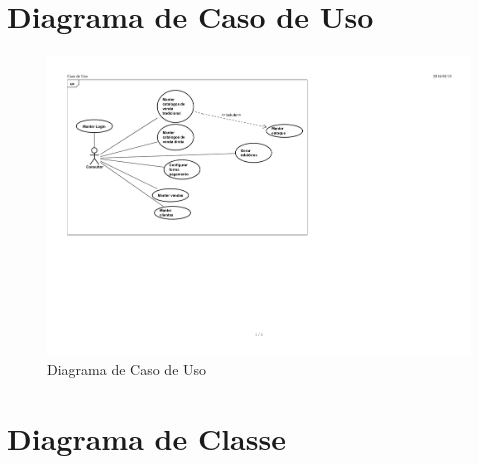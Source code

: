 \documentclass[chapter=TITLE,12pt,oneside,a4paper,english,french,sumario=tradicional,spanish,brazil,]{abntex2}
\begin{document}
\section{Diagrama de Caso de Uso}
\begin{figure}[!htpb]\centering
	\includegraphics[scale=1.02]{caso-de-uso.pdf}\caption{Diagrama de Caso de Uso\label{uc}}
\end{figure}


\section{Diagrama de Classe}
\end{document}
